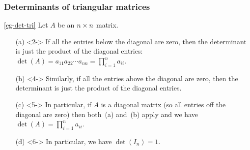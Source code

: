 \documentclass[9pt]{beamer}
\begin{document}
\begin{frame}[t]
 \frametitle{Determinants of triangular matrices}
 \begin{example*}{\ref{eg-det-tri}}
  Let $A$ be an $n\times n$ matrix.
  \begin{itemize}
   \item[(a)]<2-> If all the entries below the diagonal are zero, then the
    determinant is just the product of the diagonal entries:
    $\det(A)=a_{11}a_{22}\dotsb a_{nn}=\prod_{i=1}^na_{ii}$.\\
   \item[(b)]<4-> Similarly, if all the entries above the diagonal are
    zero, then the determinant is just the product of the diagonal
    entries.
   \item[(c)]<5-> In particular, if $A$ is a diagonal matrix (so all
    entries off the diagonal are zero) then both~(a) and~(b) apply and
    we have $\det(A)=\prod_{i=1}^na_{ii}$.
   \item[(d)]<6-> In particular, we have $\det(I_n)=1$.
  \end{itemize}
 \end{example*}
\end{frame}
\end{document}
